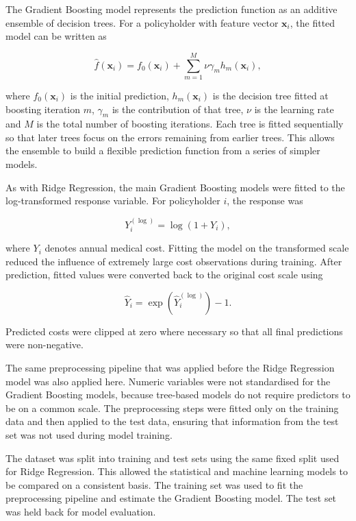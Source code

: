 \documentclass[11pt]{article}
\begin{document}
	The Gradient Boosting model represents the prediction function as an additive ensemble of decision trees. For a policyholder with feature vector \(\mathbf{x}_i\), the fitted model can be written as
	
	\begin{equation}
		\hat{f}(\mathbf{x}_i)
		=
		f_0(\mathbf{x}_i)
		+
		\sum_{m=1}^{M}
		\nu \gamma_m h_m(\mathbf{x}_i),
	\end{equation}
	
	where \(f_0(\mathbf{x}_i)\) is the initial prediction, \(h_m(\mathbf{x}_i)\) is the decision tree fitted at boosting iteration \(m\), \(\gamma_m\) is the contribution of that tree, \(\nu\) is the learning rate and \(M\) is the total number of boosting iterations. Each tree is fitted sequentially so that later trees focus on the errors remaining from earlier trees. This allows the ensemble to build a flexible prediction function from a series of simpler models.
	
	As with Ridge Regression, the main Gradient Boosting models were fitted to the log-transformed response variable. For policyholder \(i\), the response was
	
	\begin{equation}
		Y_i^{(\log)} = \log(1 + Y_i),
	\end{equation}
	
	where \(Y_i\) denotes annual medical cost. Fitting the model on the transformed scale reduced the influence of extremely large cost observations during training. After prediction, fitted values were converted back to the original cost scale using
	
	\begin{equation}
		\hat{Y}_i = \exp\left(\hat{Y}_i^{(\log)}\right) - 1.
	\end{equation}
	
	Predicted costs were clipped at zero where necessary so that all final predictions were non-negative.
	
	The same preprocessing pipeline that was applied before the Ridge Regression model was also applied here. Numeric variables were not standardised for the Gradient Boosting models, because tree-based models do not require predictors to be on a common scale. The preprocessing steps were fitted only on the training data and then applied to the test data, ensuring that information from the test set was not used during model training.
	
	The dataset was split into training and test sets using the same fixed split used for Ridge Regression. This allowed the statistical and machine learning models to be compared on a consistent basis. The training set was used to fit the preprocessing pipeline and estimate the Gradient Boosting model. The test set was held back for model evaluation.
	
\end{document}
